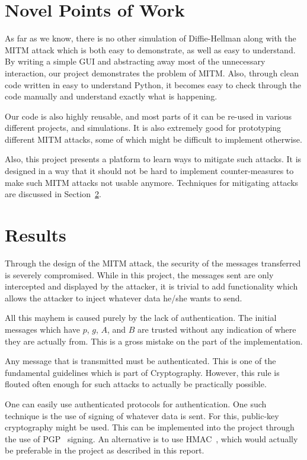 \documentclass[12pt,a4paper]{article}
\begin{document}
\section{Novel Points of Work}
\label{sec:novel}

As far as we know, there is no other simulation of Diffie-Hellman along with the MITM attack which is both easy to demonstrate, as well as easy to understand. By writing a simple GUI and abstracting away most of the unnecessary interaction, our project demonstrates the problem of MITM. Also, through clean code written in easy to understand Python, it becomes easy to check through the code manually and understand exactly what is happening.

Our code is also highly reusable, and most parts of it can be re-used in various different projects, and simulations. It is also extremely good for prototyping different MITM attacks, some of which might be difficult to implement otherwise.

Also, this project presents a platform to learn ways to mitigate such attacks. It is designed in a way that it should not be hard to implement counter-measures to make such MITM attacks not usable anymore. Techniques for mitigating attacks are discussed in Section~\ref{sec:results}.

\section{Results}
\label{sec:results}

Through the design of the MITM attack, the security of the messages transferred is severely compromised. While in this project, the messages sent are only intercepted and displayed by the attacker, it is trivial to add functionality which allows the attacker to inject whatever data he/she wants to send.

All this mayhem is caused purely by the lack of authentication. The initial messages which have $p$, $g$, $A$, and $B$ are trusted without any indication of where they are actually from. This is a gross mistake on the part of the implementation.

Any message that is transmitted must be authenticated. This is one of the fundamental guidelines which is part of Cryptography. However, this rule is flouted often enough for such attacks to actually be practically possible.

One can easily use authenticated protocols for authentication. One such technique is the use of signing of whatever data is sent. For this, public-key cryptography might be used. This can be implemented into the project through the use of PGP~\cite{pgp} signing. An alternative is to use HMAC~\cite{hmac}, which would actually be preferable in the project as described in this report.
\end{document}
